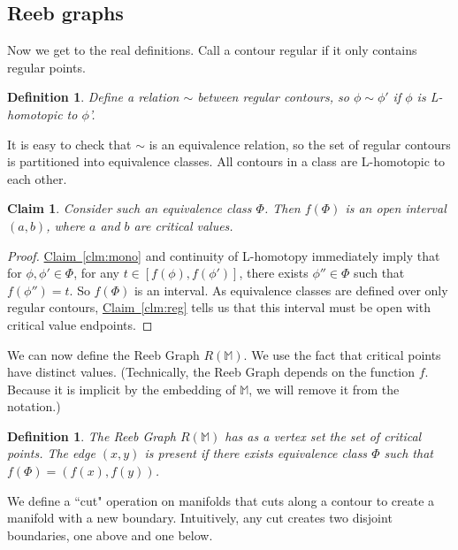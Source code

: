 \documentclass[11pt]{article}
\newtheorem{claim}[theorem]{Claim}
\newtheorem{definition}[theorem]{Definition}
\theoremstyle{definition}
\newcommand{\MM}{\mathbb{M}}
\newcommand{\Clm}[1]{\hyperref[clm:#1]{Claim~\ref*{clm:#1}}} %
\newcommand{\reeb}{R}
\begin{document}
\subsection{Reeb graphs} \label{sec:reeb}

Now we get to the real definitions. Call a contour regular if it only contains regular points.

\begin{definition} \label{def:rel} Define a relation $\sim$ between regular contours, so $\phi \sim \phi'$ if $\phi$
is L-homotopic to $\phi$'.
\end{definition}

It is easy to check that $\sim$ is an equivalence relation, so the set of regular contours
is partitioned into equivalence classes. All contours in a class are L-homotopic to each other.

\begin{claim} \label{clm:equiv} Consider such an equivalence class $\Phi$. Then $f(\Phi)$
is an open interval $(a,b)$, where $a$ and $b$ are critical values.
\end{claim}

\begin{proof} \Clm{mono} and continuity of L-homotopy immediately imply that for $\phi, \phi' \in \Phi$,
for any $t \in [f(\phi),f(\phi')]$, there exists $\phi'' \in \Phi$ such that $f(\phi'') = t$.
So $f(\Phi)$ is an interval. As equivalence classes are defined over only regular contours, \Clm{reg} 
tells us that this interval must be open with critical value endpoints.
\end{proof}

We can now define the Reeb Graph $\reeb(\MM)$. We use the fact that critical points 
have distinct values. (Technically, the Reeb Graph depends on the function $f$.
Because it is implicit by the embedding of $\MM$, we will remove it from the notation.)

\begin{definition} \label{def:reeb} The \emph{Reeb Graph} $\reeb(\MM)$ has as a vertex set
the set of critical points. The edge $(x,y)$ is present if there exists equivalence class
$\Phi$ such that $f(\Phi) = (f(x),f(y))$.
\end{definition}

We define a ``cut" operation on manifolds that cuts along a contour to create
a manifold with a new boundary. Intuitively, any cut creates two disjoint boundaries, one
above and one below.
\end{document}
